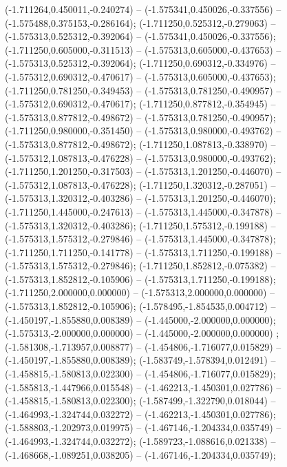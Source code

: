  (-1.711264,0.450011,-0.240274) -- (-1.575341,0.450026,-0.337556) -- (-1.575488,0.375153,-0.286164);
 (-1.711250,0.525312,-0.279063) -- (-1.575313,0.525312,-0.392064) -- (-1.575341,0.450026,-0.337556);
 (-1.711250,0.605000,-0.311513) -- (-1.575313,0.605000,-0.437653) -- (-1.575313,0.525312,-0.392064);
 (-1.711250,0.690312,-0.334976) -- (-1.575312,0.690312,-0.470617) -- (-1.575313,0.605000,-0.437653);
 (-1.711250,0.781250,-0.349453) -- (-1.575313,0.781250,-0.490957) -- (-1.575312,0.690312,-0.470617);
 (-1.711250,0.877812,-0.354945) -- (-1.575313,0.877812,-0.498672) -- (-1.575313,0.781250,-0.490957);
 (-1.711250,0.980000,-0.351450) -- (-1.575313,0.980000,-0.493762) -- (-1.575313,0.877812,-0.498672);
 (-1.711250,1.087813,-0.338970) -- (-1.575312,1.087813,-0.476228) -- (-1.575313,0.980000,-0.493762);
 (-1.711250,1.201250,-0.317503) -- (-1.575313,1.201250,-0.446070) -- (-1.575312,1.087813,-0.476228);
 (-1.711250,1.320312,-0.287051) -- (-1.575313,1.320312,-0.403286) -- (-1.575313,1.201250,-0.446070);
 (-1.711250,1.445000,-0.247613) -- (-1.575313,1.445000,-0.347878) -- (-1.575313,1.320312,-0.403286);
 (-1.711250,1.575312,-0.199188) -- (-1.575313,1.575312,-0.279846) -- (-1.575313,1.445000,-0.347878);
 (-1.711250,1.711250,-0.141778) -- (-1.575313,1.711250,-0.199188) -- (-1.575313,1.575312,-0.279846);
 (-1.711250,1.852812,-0.075382) -- (-1.575313,1.852812,-0.105906) -- (-1.575313,1.711250,-0.199188);
 (-1.711250,2.000000,0.000000) -- (-1.575313,2.000000,0.000000) -- (-1.575313,1.852812,-0.105906);
 (-1.578495,-1.854535,0.004712) -- (-1.450197,-1.855880,0.008389) -- (-1.445000,-2.000000,0.000000);
 (-1.575313,-2.000000,0.000000) -- (-1.445000,-2.000000,0.000000) ;
 (-1.581308,-1.713957,0.008877) -- (-1.454806,-1.716077,0.015829) -- (-1.450197,-1.855880,0.008389);
 (-1.583749,-1.578394,0.012491) -- (-1.458815,-1.580813,0.022300) -- (-1.454806,-1.716077,0.015829);
 (-1.585813,-1.447966,0.015548) -- (-1.462213,-1.450301,0.027786) -- (-1.458815,-1.580813,0.022300);
 (-1.587499,-1.322790,0.018044) -- (-1.464993,-1.324744,0.032272) -- (-1.462213,-1.450301,0.027786);
 (-1.588803,-1.202973,0.019975) -- (-1.467146,-1.204334,0.035749) -- (-1.464993,-1.324744,0.032272);
 (-1.589723,-1.088616,0.021338) -- (-1.468668,-1.089251,0.038205) -- (-1.467146,-1.204334,0.035749);
